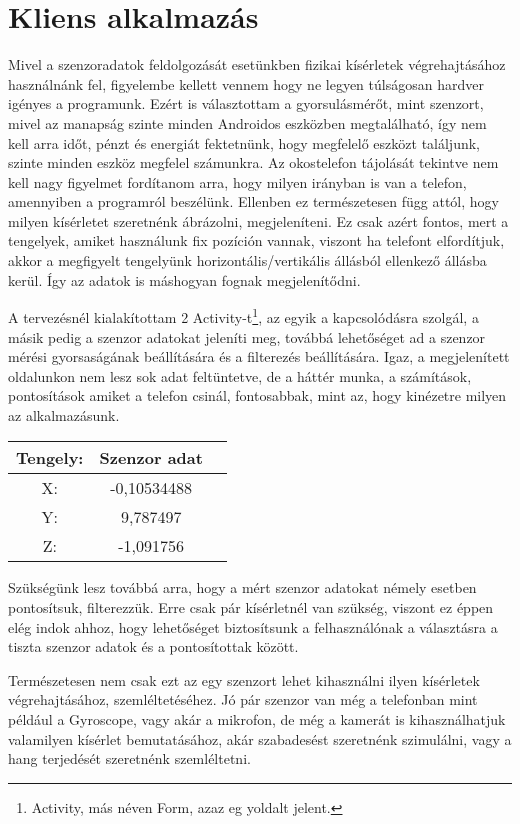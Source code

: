 \documentclass{thesis-ekf}
\theoremstyle{definition}
\theoremstyle{remark}
\begin{document}
\chapter{Kliens alkalmazás}
Mivel a szenzoradatok feldolgozását esetünkben fizikai kísérletek végrehajtásához használnánk fel, figyelembe kellett vennem hogy ne legyen túlságosan hardver igényes a programunk. Ezért is választottam a gyorsulásmérőt, mint szenzort, mivel az manapság szinte minden Androidos eszközben megtalálható, így nem kell arra időt, pénzt és energiát fektetnünk, hogy megfelelő eszközt találjunk, szinte minden eszköz megfelel számunkra. Az okostelefon tájolását tekintve nem kell nagy figyelmet fordítanom arra, hogy milyen irányban is van a telefon, amennyiben a programról beszélünk. Ellenben ez természetesen függ attól, hogy milyen kísérletet szeretnénk ábrázolni, megjeleníteni. Ez csak azért fontos, mert a tengelyek, amiket használunk fix pozíción vannak, viszont ha telefont elfordítjuk, akkor a megfigyelt tengelyünk horizontális/vertikális állásból ellenkező állásba kerül. Így az adatok is máshogyan fognak megjelenítődni.
\par A tervezésnél kialakítottam 2 Activity-t\footnote{Activity, más néven Form, azaz eg yoldalt jelent.}, az egyik a kapcsolódásra szolgál, a másik pedig a szenzor adatokat jeleníti meg, továbbá lehetőséget ad a szenzor mérési gyorsaságának beállítására és a filterezés beállítására. Igaz, a megjelenített oldalunkon nem lesz sok adat feltüntetve, de a háttér munka, a számítások, pontosítások amiket a telefon csinál, fontosabbak, mint az, hogy kinézetre milyen az alkalmazásunk.
\begin{center}
	\begin{tabular}{ |c|c|c| } 
		\hline
		Tengely: & Szenzor adat \\
		\hline\hline
		X: & -0,10534488  \\
		\hline
		Y: & 9,787497 \\
		\hline
		Z: & -1,091756 \\
		\hline
	\end{tabular}
\end{center}
\par Szükségünk lesz továbbá arra, hogy a mért szenzor adatokat némely esetben pontosítsuk, filterezzük. Erre csak pár kísérletnél van szükség, viszont ez éppen elég indok ahhoz, hogy lehetőséget biztosítsunk a felhasználónak a választásra a tiszta szenzor adatok és a pontosítottak között.
\par Természetesen nem csak ezt az egy szenzort lehet kihasználni ilyen kísérletek végrehajtásához, szemléltetéséhez. Jó pár szenzor van még a telefonban mint például a Gyroscope, vagy akár a mikrofon, de még a kamerát is kihasználhatjuk valamilyen kísérlet bemutatásához, akár szabadesést szeretnénk szimulálni, vagy a hang terjedését szeretnénk szemléltetni.
\end{document}

